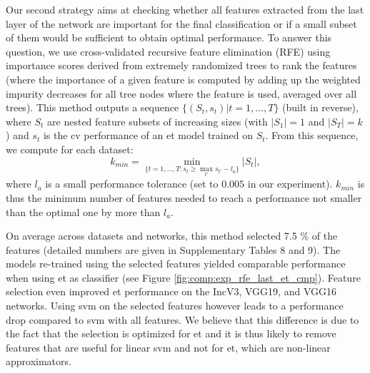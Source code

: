 Our second strategy aims at checking whether all features extracted from the last layer of the network are important for the final classification or if a small subset of them would be sufficient to obtain optimal performance. To answer this question, we use cross-validated recursive feature elimination (RFE) \parencite{guyon2002gene} using importance scores derived from extremely randomized trees to rank the features (where the importance of a given feature is computed by adding up the weighted impurity decreases for all tree nodes where the feature is used, averaged over all trees). This method outputs a sequence $\{(S_t,s_t)|t=1,\ldots,T\}$ (built in reverse), where $S_t$ are nested feature subsets of increasing sizes (with $|S_1|=1$ and $|S_T|=k$) and $s_t$ is the \acrlong{cv} performance of an \acrshort{et} model trained on $S_t$. From this sequence, we compute for each dataset:
$$k_{min} = \min_{\{t=1,\ldots,T: s_t\geq \max_{t'} s_{t'}-l_a\}} |S_t|,$$
where $l_a$ is a small performance tolerance (set to $0.005$ in our experiment). $k_{min}$ is thus the minimum number of features needed to reach a performance not smaller than the optimal one by more than $l_a$.




On average across datasets and networks, this method selected 7.5 \% of the features (detailed numbers are given in Supplementary Tables 8 and 9). The models re-trained using the selected features yielded comparable performance when using \acrshort{et} as classifier (see Figure \ref{fig:comp:exp_rfe_last_et_cmp}). Feature selection even improved \acrshort{et} performance on the IncV3, VGG19, and VGG16 networks. Using \acrshort{svm} on the selected features however leads to a performance drop compared to \acrshort{svm} with all features. We believe that this difference is due to the fact that the selection is optimized for \acrshort{et} and it is thus likely to remove features that are useful for linear \acrshort{svm} and not for \acrshort{et}, which are non-linear approximators.

